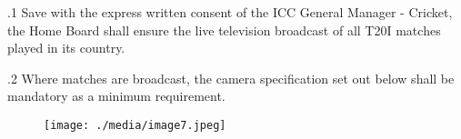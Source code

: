 \documentclass[12pt]{article}
\begin{document}
\vspace{\baselineskip}
\begin{adjustwidth}{0.5in}{0.19in}
{\fontsize{9pt}{10.8pt}.1 \tabto{0.49in} Save with the express written consent of the ICC General Manager - Cricket, the Home Board shall ensure the live television broadcast of all T20I matches played in its country.\par}\par

\end{adjustwidth}


\vspace{\baselineskip}
\begin{adjustwidth}{0.5in}{0.32in}
{\fontsize{9pt}{10.8pt}.2 \tabto{0.49in} Where matches are broadcast, the camera specification set out below shall be mandatory as a minimum requirement.\par}\par

\end{adjustwidth}




\begin{figure}[H]
\advance\leftskip 0.95in		\texttt{[image: ./media/image7.jpeg]}
\end{figure}



\par


\vspace{\baselineskip}

\vspace{\baselineskip}

\vspace{\baselineskip}

\vspace{\baselineskip}

\vspace{\baselineskip}

\vspace{\baselineskip}

\vspace{\baselineskip}

\vspace{\baselineskip}

\vspace{\baselineskip}
\end{document}
